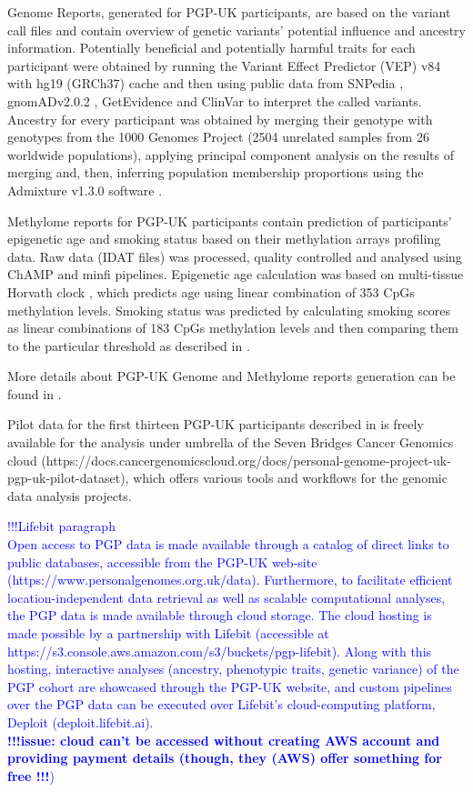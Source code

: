 \documentclass[english]{article}
\begin{document}
Genome Reports, generated for PGP-UK participants, are based on the variant call files and contain overview of genetic variants' potential influence and ancestry information. Potentially beneficial and potentially harmful traits for each participant were obtained by running the Variant Effect Predictor (VEP) v84 \cite{ensembl} with hg19 (GRCh37) cache and then using public data from SNPedia \cite{snpedia}, gnomADv2.0.2 \cite{gnomad}, GetEvidence \cite{get_evidence} and ClinVar \cite{clinvar} to interpret the called variants. Ancestry for every participant was obtained by merging their genotype with genotypes from the 1000 Genomes Project \cite{1000genomes} (2504 unrelated samples from 26 worldwide populations), applying principal component analysis on the results of merging and, then, inferring population membership proportions using the Admixture v1.3.0 software \cite{ancestry}.

Methylome reports for PGP-UK participants contain prediction of participants' epigenetic age and smoking status based on their methylation arrays profiling data. Raw data (IDAT files) was processed, quality controlled and analysed using ChAMP \cite{champ2013, champ2017} and minfi \cite{minfi} pipelines. Epigenetic age calculation was based on multi-tissue Horvath clock \cite{horvath}, which predicts age using linear combination of 353 CpGs methylation levels. Smoking status was predicted by calculating smoking scores as linear combinations of 183 CpGs methylation levels and then comparing them to the particular threshold as described in \cite{smoking_score}.

More details about PGP-UK Genome and Methylome reports generation can be found in \cite{pgp10}.

Pilot data for the first thirteen PGP-UK participants described in \cite{pgp10} is freely available for the analysis under umbrella of the Seven Bridges Cancer Genomics cloud (https://docs.cancergenomicscloud.org/docs/personal-genome-project-uk-pgp-uk-pilot-dataset), which offers various tools and workflows for the genomic data analysis projects.

\textcolor{blue}{!!!Lifebit paragraph\\
Open access to PGP data is made available through a catalog of direct links to public databases, accessible from the PGP-UK web-site\\ (https://www.personalgenomes.org.uk/data). Furthermore, to facilitate efficient location-independent data retrieval as well as scalable computational analyses, the PGP data is made available through cloud storage. The cloud hosting is made possible by a partnership with Lifebit (accessible at https://s3.console.aws.amazon.com/s3/buckets/pgp-lifebit). Along with this hosting, interactive analyses (ancestry, phenotypic traits, genetic variance) of the PGP cohort are showcased through the PGP-UK website, and custom pipelines over the PGP data can be executed over Lifebit’s cloud-computing platform, Deploit (deploit.lifebit.ai).\\
\textbf{!!!issue: cloud can't be accessed without creating AWS account and providing payment details (though, they (AWS) offer something for free !!!})
}
\end{document}

